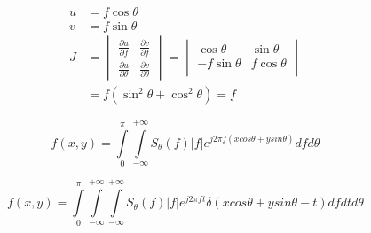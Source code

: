 \documentclass[journal, onecolumn, 11pt]{IEEEtran}
\begin{document}
\begin{align}
	u &= f \cos\theta \\
	v &= f \sin\theta \\
	J &= \begin{vmatrix}
		\frac{\partial u}{\partial f} & \frac{\partial v}{\partial f} \\ 
		\frac{\partial u}{\partial \theta} & \frac{\partial v}{\partial \theta} 
	\end{vmatrix} = \begin{vmatrix}
		\cos\theta & \sin\theta \\ 
		-f\sin\theta & f\cos\theta \\
	\end{vmatrix} \\
	&= f(\sin^2\theta + \cos^2\theta) = f
	\end{align}

\begin{equation}
	f(x,y) = \int\limits_0^\pi\int\limits_{-\infty}^{+\infty}S_{\theta}(f)|f|e^{j2\pi{f}(x cos\theta + y sin\theta)}df d\theta
\end{equation}

\begin{equation}
	f(x,y) = \int\limits_0^\pi\int\limits_{-\infty}^{+\infty}\int\limits_{-\infty}^{+\infty}S_{\theta}(f)|f|e^{j2\pi{f}t}\delta(x cos\theta + y sin\theta - t) df dt d\theta
\end{equation}
\end{document}
